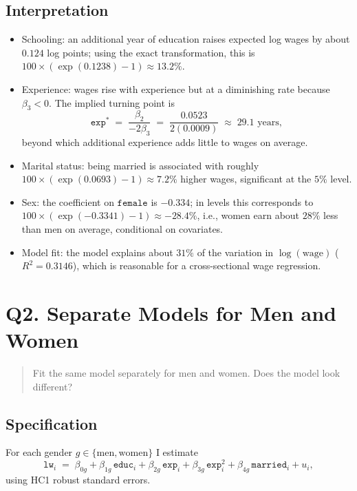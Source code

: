 \documentclass[12pt]{article}
\begin{document}
\subsection*{Interpretation}
\begin{itemize}[leftmargin=1.25em]
  \item Schooling: an additional year of education raises expected log wages by about \(0.124\) log points; using the exact transformation, this is \(100\times(\exp(0.1238)-1)\approx 13.2\%\).
  \item Experience: wages rise with experience but at a diminishing rate because \(\beta_3<0\). The implied turning point is
  \[
    \texttt{exp}^{*} \;=\; \frac{\beta_2}{-2\beta_3}
    \;=\; \frac{0.0523}{2(0.0009)} \;\approx\; 29.1 \text{ years},
  \]
  beyond which additional experience adds little to wages on average.
  \item Marital status: being married is associated with roughly \(100\times(\exp(0.0693)-1)\approx 7.2\%\) higher wages, significant at the \(5\%\) level.
  \item Sex: the coefficient on \(\texttt{female}\) is \(-0.334\); in levels this corresponds to \(100\times(\exp(-0.3341)-1)\approx -28.4\%\), i.e., women earn about \(28\%\) less than men on average, conditional on covariates.
  \item Model fit: the model explains about \(31\%\) of the variation in \(\log(\text{wage})\) (\(R^2=0.3146\)), which is reasonable for a cross-sectional wage regression.
\end{itemize}


\section*{Q2. Separate Models for Men and Women}

\begin{quote}
Fit the same model separately for men and women. Does the model look different?
\end{quote}

\subsection*{Specification}
For each gender \(g\in\{\text{men},\text{women}\}\) I estimate
\[
  \texttt{lw}_{i} \;=\; \beta_{0g}
  + \beta_{1g}\,\texttt{educ}_{i}
  + \beta_{2g}\,\texttt{exp}_{i}
  + \beta_{3g}\,\texttt{exp}_{i}^{2}
  + \beta_{4g}\,\texttt{married}_{i}
  + u_{i},
\]
using HC1 robust standard errors.
\end{document}
